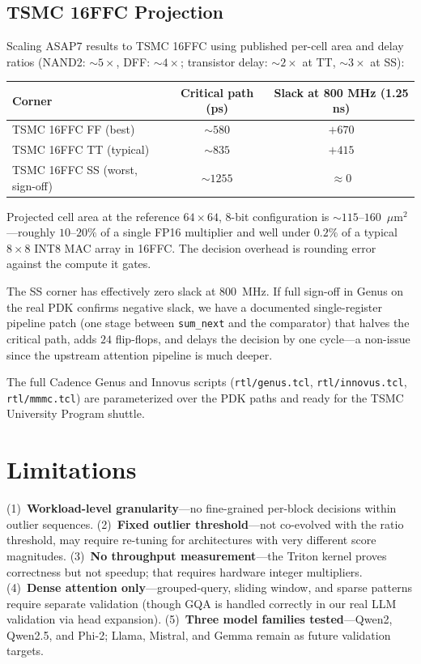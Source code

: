 \documentclass[10pt,twocolumn]{article}
\begin{document}
\subsection{TSMC 16FFC Projection}
\label{sec:rtl_16ffc}

Scaling ASAP7 results to TSMC 16FFC using published per-cell area and
delay ratios (NAND2: $\sim\!5\times$, DFF: $\sim\!4\times$; transistor
delay: $\sim\!2\times$ at TT, $\sim\!3\times$ at SS):

\begin{center}
\small
\begin{tabular}{lcc}
\toprule
Corner & Critical path (ps) & Slack at 800 MHz (1.25 ns) \\
\midrule
TSMC 16FFC FF (best)            & $\sim\!580$ & $+670$ \\
TSMC 16FFC TT (typical)         & $\sim\!835$ & $+415$ \\
TSMC 16FFC SS (worst, sign-off) & $\sim\!1255$ & $\approx 0$ \\
\bottomrule
\end{tabular}
\end{center}

Projected cell area at the reference $64\times64$, $8$-bit configuration
is $\sim\!115$--$160$~$\mu$m$^2$---roughly $10$--$20\%$ of a single
FP16 multiplier and well under $0.2\%$ of a typical $8\times8$ INT8
MAC array in 16FFC. The decision overhead is rounding error against
the compute it gates.

The SS corner has effectively zero slack at $800$~MHz. If full sign-off
in Genus on the real PDK confirms negative slack, we have a documented
single-register pipeline patch (one stage between
\texttt{sum\_next} and the comparator) that halves the critical path,
adds $24$ flip-flops, and delays the decision by one cycle---a non-issue
since the upstream attention pipeline is much deeper.

The full Cadence Genus and Innovus scripts (\texttt{rtl/genus.tcl},
\texttt{rtl/innovus.tcl}, \texttt{rtl/mmmc.tcl}) are parameterized over
the PDK paths and ready for the TSMC University Program shuttle.

\section{Limitations}

(1)~\textbf{Workload-level granularity}---no
fine-grained per-block decisions within outlier sequences.
(2)~\textbf{Fixed outlier threshold}---not co-evolved with the ratio
threshold, may require re-tuning for architectures with very different
score magnitudes.
(3)~\textbf{No throughput measurement}---the Triton kernel proves
correctness but not speedup; that requires hardware integer multipliers.
(4)~\textbf{Dense attention only}---grouped-query, sliding window, and
sparse patterns require separate validation (though GQA is handled
correctly in our real LLM validation via head expansion).
(5)~\textbf{Three model families tested}---Qwen2, Qwen2.5, and Phi-2;
Llama, Mistral, and Gemma remain as future validation targets.
\end{document}

